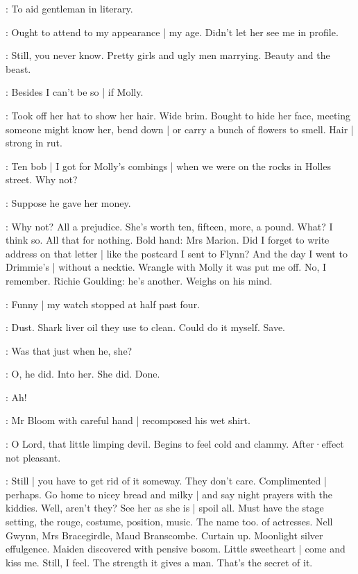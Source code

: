 \BloomAbstract:
To aid gentleman in literary.

\BloomCurrent:
Ought to attend to my appearance |
my age.
Didn't let her see me in profile.

\BloomAbstract:
Still,
you never know.
Pretty girls and ugly men marrying.
Beauty and the beast.

\BloomHist:
Besides I can't be so |
if Molly.

\BloomCurrent:
Took off her hat to show her hair.
Wide brim.
Bought to hide her face,
meeting someone might know her,
bend down |
or carry a bunch of flowers to smell.
Hair |
strong in rut.

\BloomHist:
Ten bob |
I got for Molly's combings |
when we were on the rocks
in Holles street.
Why not?

\BloomToday:
Suppose he gave her money.

\BloomHist:
Why not?
All a prejudice.
She's worth ten,
fifteen,
more,
a pound.
What?
I think so.
All that for nothing.
Bold hand:
Mrs Marion.
Did I forget
to write address on that letter |
like the postcard I sent to Flynn?
And the day I went to Drimmie's |
without a necktie.
Wrangle with Molly
it was put me off.
No,
I remember.
Richie Goulding:
he's another.
Weighs on his mind.

\BloomToday:
Funny |
my watch stopped at half past four.

\BloomAbstract:
Dust.
Shark liver oil
they use to clean.
Could do it myself.
Save.

\BloomToday:
Was that just when he,
she?

\BloomToday:
O,
he did.
Into her.
She did.
Done.

\BloomInt:
Ah!%

:
Mr Bloom with careful hand |
recomposed his wet shirt.

\BloomCurrent:
O Lord,
that little limping devil.
Begins to feel cold and clammy.
After·effect not pleasant.

\BloomAbstract:
Still |
you have to get rid of it someway.
They don't care.
Complimented |
perhaps.
Go home to nicey bread and milky |
and say night prayers with the kiddies.
Well,
aren't they?
See her as she is |
spoil all.
Must have the stage setting,
the rouge,
costume,
position,
music.
The name too.
 of actresses.
Nell Gwynn,
Mrs Bracegirdle,
Maud Branscombe.
Curtain up.
Moonlight silver effulgence.
Maiden discovered with pensive bosom.
Little sweetheart |
come and kiss me.
Still,
I feel.
The strength it gives a man.
That's the secret of it.%

